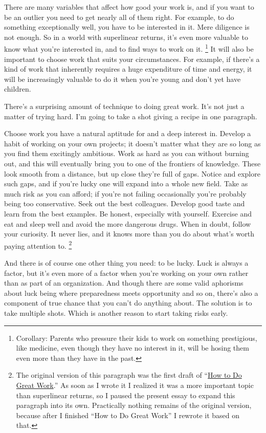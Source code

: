 \documentclass[12pt]{book}
\begin{document}
There are many variables that affect how good your work is, and if you
want to be an outlier you need to get nearly all of them right. For
example, to do something exceptionally well, you have to be interested
in it. Mere diligence is not enough. So in a world with superlinear
returns, it's even more valuable to know what you're interested in, and
to find ways to work on it. \footnote{Corollary: Parents who pressure their kids to work on something
prestigious, like medicine, even though they have no interest in it,
will be hosing them even more than they have in the past.} It will also be
important to choose work that suits your circumstances. For example, if
there's a kind of work that inherently requires a huge expenditure of
time and energy, it will be increasingly valuable to do it when you're
young and don't yet have children.

There's a surprising amount of technique to doing great work. It's not
just a matter of trying hard. I'm going to take a shot giving a recipe
in one paragraph.

Choose work you have a natural aptitude for and a deep interest in.
Develop a habit of working on your own projects; it doesn't matter what
they are so long as you find them excitingly ambitious. Work as hard as
you can without burning out, and this will eventually bring you to one
of the frontiers of knowledge. These look smooth from a distance, but up
close they're full of gaps. Notice and explore such gaps, and if you're
lucky one will expand into a whole new field. Take as much risk as you
can afford; if you're not failing occasionally you're probably being too
conservative. Seek out the best colleagues. Develop good taste and learn
from the best examples. Be honest, especially with yourself. Exercise
and eat and sleep well and avoid the more dangerous drugs. When in
doubt, follow your curiosity. It never lies, and it knows more than you
do about what's worth paying attention to. \footnote{The original version of this paragraph was the first draft of
``\href{greatwork.html}{How to Do Great Work}.'' As soon as I wrote it I
realized it was a more important topic than superlinear returns, so I
paused the present essay to expand this paragraph into its own.
Practically nothing remains of the original version, because after I
finished ``How to Do Great Work'' I rewrote it based on that.}

And there is of course one other thing you need: to be lucky. Luck is
always a factor, but it's even more of a factor when you're working on
your own rather than as part of an organization. And though there are
some valid aphorisms about luck being where preparedness meets
opportunity and so on, there's also a component of true chance that you
can't do anything about. The solution is to take multiple shots. Which
is another reason to start taking risks early.
\end{document}
